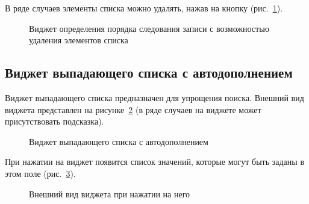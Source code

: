 В ряде случаев элементы списка можно удалять, нажав на кнопку  (рис.~\ref{img:widgect:ordered_list_with_delete}).

\begin{figure}[H]
	\caption{Виджет определения порядка следования записи с возможностью удаления элементов списка}
	\label{img:widgect:ordered_list_with_delete}
\end{figure}
\subsection{Виджет выпадающего списка с автодополнением}
\label{widget:autocomplete}
Виджет выпадающего списка предназначен для упрощения поиска. Внешний вид виджета представлен на рисунке~\ref{img:widgect:autocomplete_view} (в ряде случаев на виджете может присутствовать подсказка).
\begin{figure}[H]
	\caption{Виджет выпадающего списка с автодополнением}
	\label{img:widgect:autocomplete_view}
\end{figure}

При нажатии на виджет появится список значений, которые могут быть заданы в этом поле (рис.~\ref{img:widgect:autocomplete_open_view}).
\begin{figure}[H]
	\caption{Внешний вид виджета при нажатии на него}
	\label{img:widgect:autocomplete_open_view}
\end{figure}

